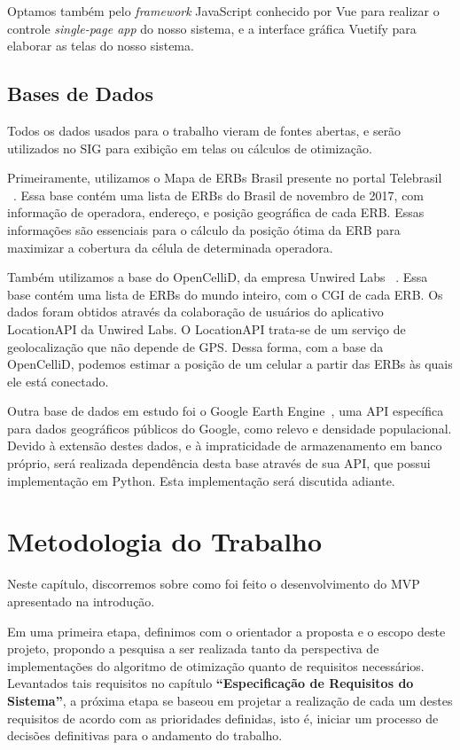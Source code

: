 \documentclass[]{politex}
\begin{document}
Optamos também pelo \textit{framework} JavaScript conhecido por Vue para realizar o
controle \emph{single-page app} do nosso sistema, e a interface gráfica Vuetify
para elaborar as telas do nosso sistema.

\section{Bases de Dados}

Todos os dados usados para o trabalho vieram de fontes abertas, e
serão utilizados no SIG para exibição em telas ou cálculos de otimização.

Primeiramente, utilizamos o Mapa de ERBs Brasil presente no portal Telebrasil
~\cite{mapa-erb}. Essa base contém uma lista de ERBs do Brasil de novembro de
2017, com informação de operadora, endereço, e posição geográfica de cada ERB.
Essas informações são essenciais para o cálculo da posição ótima da ERB para
maximizar a cobertura da célula de determinada operadora.

Também utilizamos a base do OpenCelliD, da empresa Unwired Labs
~\cite{opencellid}. Essa base contém uma lista de ERBs do mundo inteiro, com o
CGI de cada ERB. Os dados foram obtidos através da colaboração de usuários do
aplicativo LocationAPI da Unwired Labs. O LocationAPI trata-se de um serviço de
geolocalização que não depende de GPS. Dessa forma, com a base da OpenCelliD,
podemos estimar a posição de um celular a partir das ERBs às quais ele está
conectado.

Outra base de dados em estudo foi o Google Earth Engine~\cite{earthengine}, uma
API específica para dados geográficos públicos do Google, como relevo e
densidade populacional. Devido à extensão destes dados, e à impraticidade de
armazenamento em banco próprio, será realizada dependência desta base através
de sua API, que possui implementação em Python. Esta implementação será
discutida adiante.

\chapter{Metodologia do Trabalho}

Neste capítulo, discorremos sobre como foi feito o desenvolvimento do MVP
apresentado na introdução.

Em uma primeira etapa, definimos com o orientador a proposta e o escopo deste
projeto, propondo a pesquisa a ser realizada tanto da perspectiva de
implementações do algoritmo de otimização quanto de requisitos necessários. Levantados tais requisitos no
capítulo \textbf{``Especificação de Requisitos do Sistema''}, a próxima etapa
se baseou em projetar a realização de cada um destes requisitos de acordo com as
prioridades definidas, isto é, iniciar um processo de decisões definitivas para
o andamento do trabalho.
\end{document}

